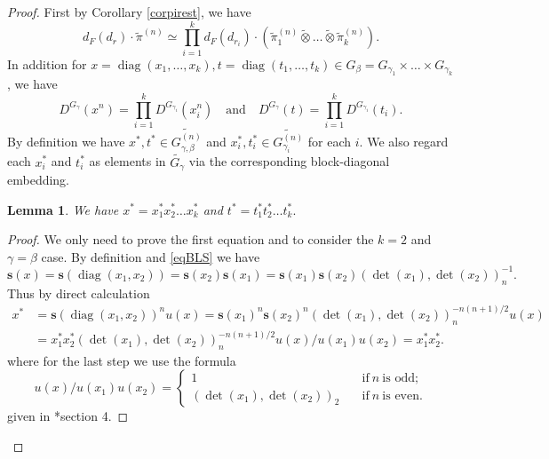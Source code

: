 \documentclass{amsart}
\numberwithin{equation}{section}
\newtheorem{lemma}[theorem]{\bf{Lemma}}
\newcommand{\mrdet}{\operatorname{det}}
\newcommand{\mrdiag}{\operatorname{diag}}
\newcommand{\dF}[1]{d_{F}(#1)}
\newcommand{\bs}[1]{\boldsymbol{#1}}
\newcommand{\wt}[1]{\widetilde{#1}}
\begin{document}
	\begin{proof}
		
		First by Corollary \ref{corpirest}, we have $$\dF{d_{r}}\cdot\wt{\pi}^{(n)}\simeq \prod_{i=1}^{k}\dF{d_{r_{i}}}\cdot(\wt{\pi}_{1}^{(n)}\wt{\otimes}\dots\wt{\otimes}\wt{\pi}_{k}^{(n)}).$$ In addition for $x=\mrdiag(x_{1},\dots,x_{k}), t=\mrdiag(t_{1},\dots,t_{k})\in G_{\beta}=G_{\gamma_{1}}\times\dots\times G_{\gamma_{k}}$, we have $$D^{G_{\gamma}}(x^{n})=\prod_{i=1}^{k}D^{G_{\gamma_{i}}}(x_{i}^{n})\quad\text{and}\quad D^{G_{\gamma}}(t)=\prod_{i=1}^{k}D^{G_{\gamma_{i}}}(t_{i}).$$ 
		By definition we have $x^{*},t^{*}\in\wt{G^{(n)}_{\gamma,\beta}}$ and $x_{i}^{*}, t_{i}^{*}\in\wt{G^{(n)}_{\gamma_{i}}}$ for each $i$. We also regard each $x_{i}^{*}$ and $t_{i}^{*}$ as elements in $\wt{G_{\gamma}}$ via the corresponding block-diagonal embedding.
		
		\begin{lemma}
			
			We have $x^{*}=x_{1}^{*}x_{2}^{*}\dots x_{k}^{*}$ and $t^{*}=t_{1}^{*}t_{2}^{*}\dots t_{k}^{*}.$
			
		\end{lemma}
		
		\begin{proof}
			
			We only need to prove the first equation and to consider the $k=2$ and $\gamma=\beta$ case. By definition and \eqref{eqBLS} we have $$\bs{s}(x)=\bs{s}(\mrdiag(x_{1},x_{2}))=\bs{s}(x_{2})\bs{s}(x_{1})=\bs{s}(x_{1})\bs{s}(x_{2})(\mrdet(x_{1}),\mrdet(x_{2}))_{n}^{-1}.$$ Thus by direct calculation 
			\begin{align*}
				x^{*}&=\bs{s}(\mrdiag(x_{1},x_{2}))^{n}u(x)=\bs{s}(x_{1})^{n}\bs{s}(x_{2})^{n}(\mrdet(x_{1}),\mrdet(x_{2}))_{n}^{-n(n+1)/2}u(x)\\
				&=x_{1}^{*}x_{2}^{*}(\mrdet(x_{1}),\mrdet(x_{2}))_{n}^{-n(n+1)/2}u(x)/u(x_{1})u(x_{2})=x_{1}^{*}x_{2}^{*}.
			\end{align*}
			where for the last step we use the formula 
			$$u(x)/u(x_{1})u(x_{2})=\begin{cases}
				1 \quad &\text{if}\ n\ \text{is odd};\\ 	(\mrdet(x_{1}),\mrdet(x_{2}))_{2} \quad& \text{if}\ n\ \text{is even}.
			\end{cases}$$
			given in \cite{flicker1986metaplectic}*{section 4}.
			
		\end{proof}
		

\end{proof}
\end{document}
